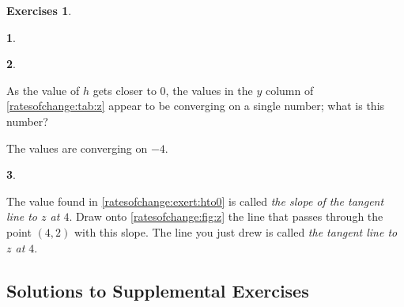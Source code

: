 \documentclass[12pt]{article}
\theoremstyle{activity}
\theoremstyle{problem}
\theoremstyle{example}
\theoremstyle{definition}
\theoremstyle{exercises}
\newtheorem{exercises}{Exercises}
\theoremstyle{exercise}
\newtheorem{exercise}{}
\begin{document}
\begin{exercises}
\begin{exercise}
\begin{answer}
\end{answer}
\end{exercise}
%
\begin{exercise}
\begin{question}
\label{ratesofchange:exert:hto0} As the value of $h$ gets closer to $0$, the values in the $y$ column of \cref{ratesofchange:tab:z} appear to be converging on a single number; what is this number? 
\end{question}
\begin{answer}
The values are converging on $-4$. 
\end{answer}
\end{exercise}
%
\begin{exercise}
\begin{question}
The value found in \cref{ratesofchange:exert:hto0} is called \emph{the slope of the tangent line to $z$ at $4$}. Draw onto \cref{ratesofchange:fig:z} the line that passes through the point $(4,2)$ with this slope. The line you just drew is called \emph{the tangent line to $z$ at $4$}. 
\end{question}
\begin{answer}
\begin{minipage}[t]{0.5\linewidth}
\vspace{0pt}
\centering
{}
\label{ratesofchange:fig:z}
\end{minipage}

\end{answer}
\end{exercise}
%
\end{exercises}


\setcounter{table}{0}
\setcounter{figure}{0}

\subsection*{Solutions to Supplemental Exercises}

\end{document}
